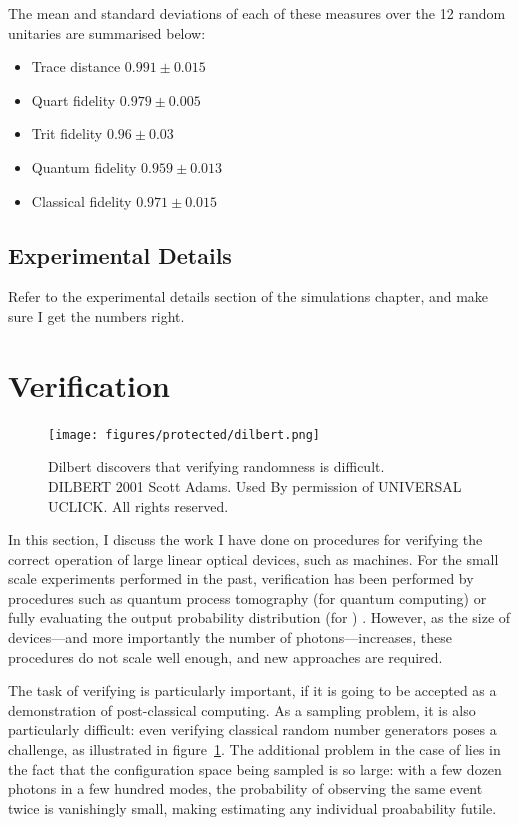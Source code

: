 The mean and standard deviations of each of these measures over the 12 random
unitaries are summarised below:
\begin{itemize}
  \item Trace distance \(0.991\pm0.015\)
  \item Quart fidelity \(0.979\pm0.005\)
  \item Trit fidelity \(0.96\pm0.03\)
  \item Quantum fidelity \(0.959\pm0.013\)
  \item Classical fidelity \(0.971\pm0.015\)
\end{itemize}

\subsection{Experimental Details}
\label{sec:BenchmarkingExperiment}
Refer to the experimental details section of the simulations chapter, and make
sure I get the numbers right.

\section{Verification}
\label{sec:Verification}
\begin{figure}[t]
  \centering
  \texttt{[image: figures/protected/dilbert.png]}
  \caption[Dilbert discovers that verifying randomness is difficult.]
  {Dilbert discovers that verifying randomness is difficult.\\DILBERT
  \textcopyright{} 2001 Scott Adams. Used By permission of UNIVERSAL UCLICK. All
  rights reserved.}
  \label{fig:dilbert}
\end{figure}
In this section, I discuss the work I have done on procedures for verifying the
correct operation of large linear optical devices, such as \bosonsampling{}
machines. For the small scale experiments performed in the past, verification
has been performed by procedures such as quantum process tomography (for
quantum computing)  or fully evaluating the output
probability distribution (for \bosonsampling{}) . However, as the size of devices---and more importantly the number
of photons---increases, these procedures do not scale well enough, and new
approaches are required.

The task of verifying \bosonsampling{} is particularly important, if it is going
to be accepted as a demonstration of post-classical computing. As a sampling
problem, it is also particularly difficult: even verifying classical random
number generators poses a challenge, as illustrated in figure~\ref{fig:dilbert}.
The additional problem in the case of \bosonsampling{} lies in the fact that the
configuration space being sampled is so large: with a few dozen photons in a few
hundred modes, the probability of observing the same event twice is vanishingly
small, making estimating any individual proabability futile.

